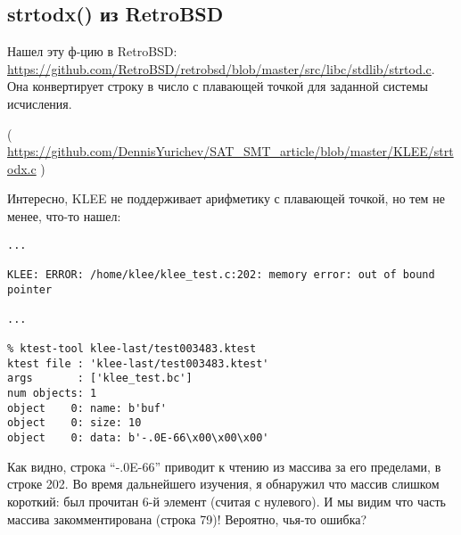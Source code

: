 \subsection{strtodx() из RetroBSD}

Нашел эту ф-цию в RetroBSD:
\url{https://github.com/RetroBSD/retrobsd/blob/master/src/libc/stdlib/strtod.c}.
Она конвертирует строку в число с плавающей точкой для заданной системы исчисления.


( \url{https://github.com/DennisYurichev/SAT_SMT_article/blob/master/KLEE/strtodx.c} )

Интересно, KLEE не поддерживает арифметику с плавающей точкой, но тем не менее, что-то нашел:

\begin{lstlisting}
...

KLEE: ERROR: /home/klee/klee_test.c:202: memory error: out of bound pointer

...

% ktest-tool klee-last/test003483.ktest
ktest file : 'klee-last/test003483.ktest'
args       : ['klee_test.bc']
num objects: 1
object    0: name: b'buf'
object    0: size: 10
object    0: data: b'-.0E-66\x00\x00\x00'
\end{lstlisting}

Как видно, строка ``-.0E-66'' приводит к чтению из массива за его пределами, в строке 202.
Во время дальнейшего изучения, я обнаружил что массив  слишком короткий:
был прочитан 6-й элемент (считая с нулевого).
И мы видим что часть массива закомментирована (строка 79)!
Вероятно, чья-то ошибка?

